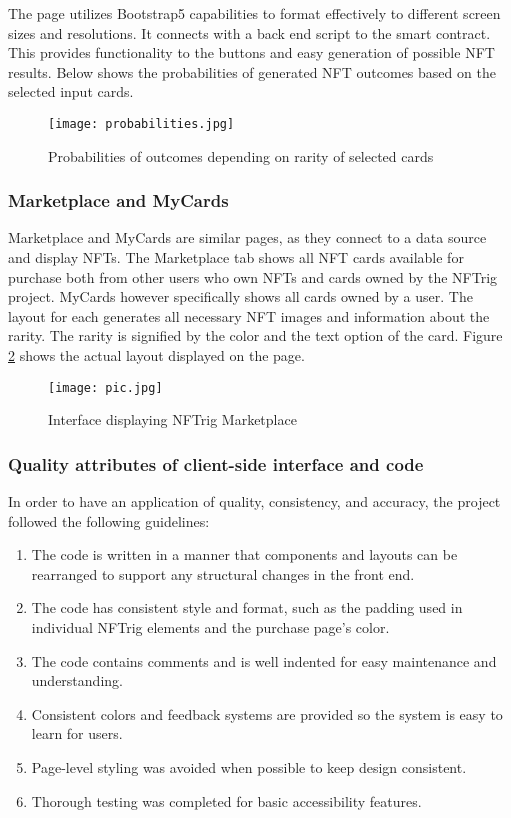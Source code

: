 \documentclass[acmsmall,nonacm]{acmart}
\begin{document}
The page utilizes Bootstrap5 capabilities to format effectively to different screen sizes and resolutions. It connects with a back end script to the smart contract. This provides functionality to the buttons and easy generation of possible NFT results. Below shows the probabilities of generated NFT outcomes based on the selected input cards. 
\begin{figure}[!htb]
    \centering
    \texttt{[image: probabilities.jpg]}
    \caption{Probabilities of outcomes depending on rarity of selected cards}
    \label{probabilities}
\end{figure}

\subsubsection{Marketplace and MyCards}
Marketplace and MyCards are similar pages, as they connect to a data source and display NFTs. The Marketplace tab shows all NFT cards available for purchase both from other users who own NFTs and cards owned by the NFTrig project. MyCards however specifically shows all cards owned by a user. The layout for each generates all necessary NFT images and information about the rarity. The rarity is signified by the color and the text option of the card. Figure \ref{mycards} shows the actual layout displayed on the page.  

\begin{figure}[!htb]
    \centering
    \texttt{[image: pic.jpg]}
    \caption{Interface displaying NFTrig Marketplace}
    \label{mycards}
\end{figure}
\subsubsection{Quality attributes of client-side interface and code}
In order to have an application of quality, consistency, and accuracy, the project followed the following guidelines:
\begin{enumerate}
    \item The code is written in a manner that components and layouts can be rearranged to support any structural changes in the front end.
    \item The code has consistent style and format, such as the padding used in individual NFTrig elements and the purchase page's color.
    \item The code contains comments and is well indented for easy maintenance and understanding.
    \item Consistent colors and feedback systems are provided so the system is easy to learn for users.
    \item Page-level styling was avoided when possible to keep design consistent.
    \item Thorough testing was completed for basic accessibility features.
    
\end{enumerate}
\end{document}
